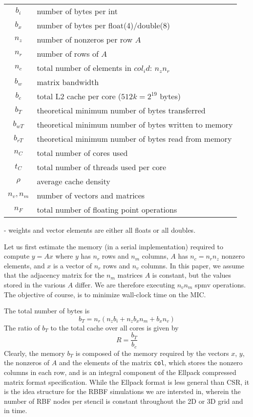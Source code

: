 \documentclass[10pt, conference, compsocconf]{IEEEtran}
\def\ttt#1{{\tt #1}}
\begin{document}
\begin{center}
\begin{tabular}{|c|l|}
\hline
$b_i$ & number of bytes per int \\
$b_x$ & number of bytes per float(4)/double(8) \\
$n_z$ & number of nonzeros per row $A$ \\
$n_r$ & number of rows of $A$ \\
$n_c$ & total number of elements in $col_id$: $n_z n_r$ \\
$b_w$ & matrix bandwidth \\
$b_c$ & total L2 cache per core ($512k=2^{19}$ bytes) \\
$b_T$ & theoretical minimum number of bytes transferred  \\
$b_{wT}$ & theoretical minimum number of bytes written to memory  \\
$b_{rT}$ & theoretical minimum number of bytes read from memory  \\
$n_C$ & total number of cores used  \\
$t_C$ & total number of threads used per core \\
$\rho$ & average cache density  \\
$n_v, n_m$ & number of vectors and matrices \\
$n_F$ & total number of floating point operations  \\
\hline
\end{tabular}
\end{center}

- weights and vector elements are either all floats or all doubles. 

Let us first estimate the memory (in a serial implementation) required to compute $y = Ax$ where $y$ has $n_r$ rows and $n_m$ columns, $A$ has
$n_c=n_r n_z$ nonzero elements, and $x$ is a vector of $n_r$ rows and 
$n_v$ columns. In this paper, we assume that the adjacency matrix for the
$n_m$ matrices $A$ is constant, but the values stored in the various $A$ differ. We are therefore executing $n_v n_m$ spmv operations. The objective of course, is to minimize wall-clock time on the MIC.

The total number of bytes is 
$$
   b_T = n_r (n_z b_i + n_z b_x n_m + b_x n_v)
$$
The ratio of $b_T$ to the total cache  over all cores is given by
$$
   R = \frac{b_T}{b_c}
$$
Clearly, the memory $b_T$ is composed of the memory required by the vectors $x$, $y$, the nonzeros of $A$ and the elements of the matrix \ttt{col}, which stores the nonzero columns in each row, and is an integral component of the Ellpack compressed matrix format specification. While the Ellpack format is less general than CSR, it is the idea structure for the RBBF simulations we are intersted in, wherein the number of RBF nodes per stencil is constant throughout the 2D or 3D grid and in time. 
\end{document}
